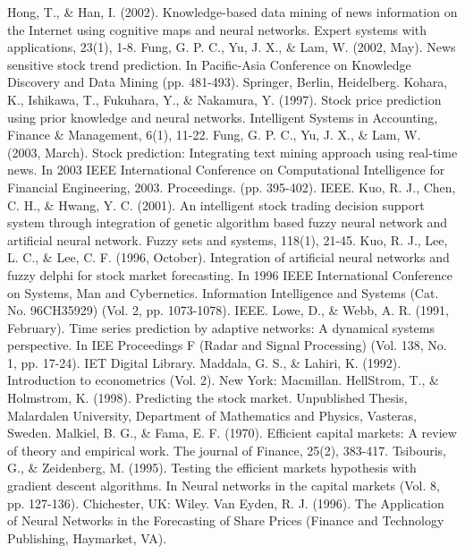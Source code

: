 \documentclass[a4paper,12pt]{report}
\begin{document}
\begin{fig}
\begin{thebibliography}{9}
	Hong, T., \& Han, I. (2002). Knowledge-based data mining of news information on the Internet using cognitive maps and neural networks. Expert systems with applications, 23(1), 1-8.
	Fung, G. P. C., Yu, J. X., \& Lam, W. (2002, May). News sensitive stock trend prediction. In Pacific-Asia Conference on Knowledge Discovery and Data Mining (pp. 481-493). Springer, Berlin, Heidelberg.
	Kohara, K., Ishikawa, T., Fukuhara, Y., \& Nakamura, Y. (1997). Stock price prediction using prior knowledge and neural networks. Intelligent Systems in Accounting, Finance \& Management, 6(1), 11-22.
	Fung, G. P. C., Yu, J. X., \& Lam, W. (2003, March). Stock prediction: Integrating text mining approach using real-time news. In 2003 IEEE International Conference on Computational Intelligence for Financial Engineering, 2003. Proceedings. (pp. 395-402). IEEE.
	Kuo, R. J., Chen, C. H., \& Hwang, Y. C. (2001). An intelligent stock trading decision support system through integration of genetic algorithm based fuzzy neural network and artificial neural network. Fuzzy sets and systems, 118(1), 21-45.
	Kuo, R. J., Lee, L. C., \& Lee, C. F. (1996, October). Integration of artificial neural networks and fuzzy delphi for stock market forecasting. In 1996 IEEE International Conference on Systems, Man and Cybernetics. Information Intelligence and Systems (Cat. No. 96CH35929) (Vol. 2, pp. 1073-1078). IEEE.
	Lowe, D., \& Webb, A. R. (1991, February). Time series prediction by adaptive networks: A dynamical systems perspective. In IEE Proceedings F (Radar and Signal Processing) (Vol. 138, No. 1, pp. 17-24). IET Digital Library.
	Maddala, G. S., \& Lahiri, K. (1992). Introduction to econometrics (Vol. 2). New York: Macmillan.
	HellStrom, T., \& Holmstrom, K. (1998). Predicting the stock market. Unpublished Thesis, Malardalen University, Department of Mathematics and Physics, Vasteras, Sweden.
	Malkiel, B. G., \& Fama, E. F. (1970). Efficient capital markets: A review of theory and empirical work. The journal of Finance, 25(2), 383-417.
	Tsibouris, G., \& Zeidenberg, M. (1995). Testing the efficient markets hypothesis with gradient descent algorithms. In Neural networks in the capital markets (Vol. 8, pp. 127-136). Chichester, UK: Wiley.
	Van Eyden, R. J. (1996). The Application of Neural Networks in the Forecasting of Share Prices (Finance and Technology Publishing, Haymarket, VA).

\end{thebibliography}
\end{fig}
\end{document}
